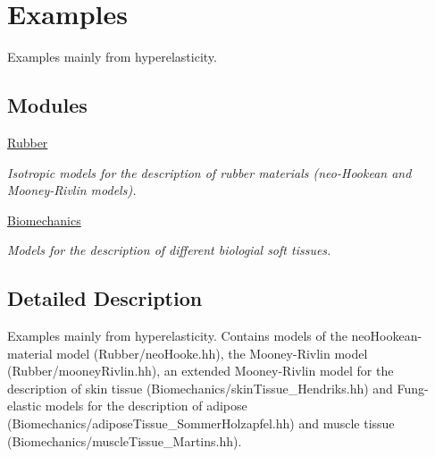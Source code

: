 \hypertarget{group__Examples}{\section{Examples}
\label{group__Examples}
}


Examples mainly from hyperelasticity.  


\subsection*{Modules}
\begin{DoxyCompactItemize}
\item 
\hyperlink{group__Rubber}{Rubber}
\begin{DoxyCompactList}\small\item\em Isotropic models for the description of rubber materials (neo-\/\-Hookean and Mooney-\/\-Rivlin models). \end{DoxyCompactList}\item 
\hyperlink{group__Biomechanics}{Biomechanics}
\begin{DoxyCompactList}\small\item\em Models for the description of different biologial soft tissues. \end{DoxyCompactList}\end{DoxyCompactItemize}


\subsection{Detailed Description}
Examples mainly from hyperelasticity. Contains models of the neo\-Hookean-\/material model (Rubber/neo\-Hooke.\-hh), the Mooney-\/\-Rivlin model (Rubber/mooney\-Rivlin.\-hh), an extended Mooney-\/\-Rivlin model for the description of skin tissue (Biomechanics/skin\-Tissue\-\_\-\-Hendriks.\-hh) and Fung-\/elastic models for the description of adipose (Biomechanics/adipose\-Tissue\-\_\-\-Sommer\-Holzapfel.\-hh) and muscle tissue (Biomechanics/muscle\-Tissue\-\_\-\-Martins.\-hh). 
